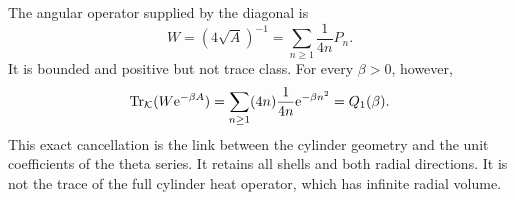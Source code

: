 The angular operator supplied by the diagonal is
\begin{equation}
 W=(4\sqrt A)^{-1}=\sum_{n\ge1}\frac1{4n}P_n.
 \label{eq:green-weight}
\end{equation}
It is bounded and positive but not trace class. For every $\beta>0$,
however,
\begin{equation}
 \operatorname{Tr}_\mathcal K(W\mathrm e^{-\beta A})
 =\sum_{n\ge1}(4n)\frac1{4n}\mathrm e^{-\beta n^2}
 =Q_1(\beta).
 \label{eq:theta-trace}
\end{equation}
This exact cancellation is the link between the cylinder geometry and
the unit coefficients of the theta series. It retains all shells and
both radial directions. It is not the trace of the full cylinder heat
operator, which has infinite radial volume.
